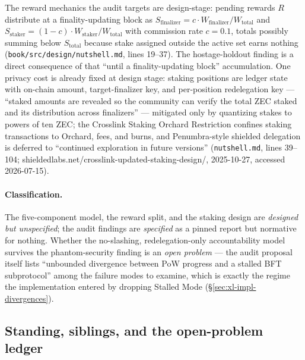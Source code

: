 \documentclass[11pt,a4paper]{article}
\theoremstyle{definition}
\begin{document}
The reward mechanics the audit targets are design-stage: pending rewards
$R$ distribute at a finality-updating block as
$S_{\mathrm{finalizer}} = c \cdot W_{\mathrm{finalizer}} /
W_{\mathrm{total}}$ and
$S_{\mathrm{staker}} = (1 - c) \cdot W_{\mathrm{staker}} /
W_{\mathrm{total}}$ with commission rate $c = 0.1$, totals possibly
summing below $S_{\mathrm{total}}$ because stake assigned outside the
active set earns nothing (\texttt{book/src/design/nutshell.md}, lines
19--37). The hostage-holdout finding is a direct consequence of that
``until a finality-updating block'' accumulation. One privacy cost is
already fixed at design stage: staking positions are ledger state with
on-chain amount, target-finalizer key, and per-position redelegation key
--- ``staked amounts are revealed so the community can verify the total
ZEC staked and its distribution across finalizers'' --- mitigated only by
quantizing stakes to powers of ten ZEC; the Crosslink Staking Orchard
Restriction confines staking transactions to Orchard, fees, and burns,
and Penumbra-style shielded delegation is deferred to ``continued
exploration in future versions'' (\texttt{nutshell.md}, lines 39--104;
shieldedlabs.net/crosslink-updated-staking-design/, 2025-10-27, accessed
2026-07-15).

\paragraph{Classification.} The five-component model, the reward split,
and the staking design are \emph{designed but unspecified}; the audit
findings are \emph{specified} as a pinned report but normative for
nothing. Whether the no-slashing, redelegation-only accountability model
survives the phantom-security finding is an \emph{open problem} --- the
audit proposal itself lists ``unbounded divergence between PoW progress
and a stalled BFT subprotocol'' among the failure modes to examine, which
is exactly the regime the implementation entered by dropping Stalled Mode
(\S\ref{sec:xl-impl-divergences}).

\subsection{Standing, siblings, and the open-problem ledger}
\label{sec:xl-open}
\end{document}
